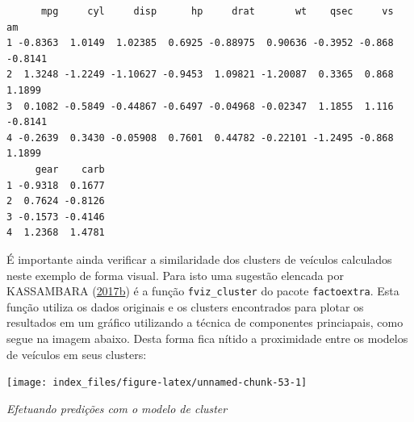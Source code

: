 \documentclass[12pt,brazil,oneside]{book}
\newenvironment{Shaded}{\begin{snugshade}}{\end{snugshade}}
\newcommand{\CommentTok}[1]{\textcolor[rgb]{0.56,0.35,0.01}{\textit{#1}}}
\newcommand{\DataTypeTok}[1]{\textcolor[rgb]{0.13,0.29,0.53}{#1}}
\newcommand{\KeywordTok}[1]{\textcolor[rgb]{0.13,0.29,0.53}{\textbf{#1}}}
\newcommand{\NormalTok}[1]{#1}
\newcommand{\OtherTok}[1]{\textcolor[rgb]{0.56,0.35,0.01}{#1}}
\newcommand{\StringTok}[1]{\textcolor[rgb]{0.31,0.60,0.02}{#1}}
\begin{document}
\begin{verbatim}
      mpg     cyl     disp      hp     drat       wt    qsec     vs      am
1 -0.8363  1.0149  1.02385  0.6925 -0.88975  0.90636 -0.3952 -0.868 -0.8141
2  1.3248 -1.2249 -1.10627 -0.9453  1.09821 -1.20087  0.3365  0.868  1.1899
3  0.1082 -0.5849 -0.44867 -0.6497 -0.04968 -0.02347  1.1855  1.116 -0.8141
4 -0.2639  0.3430 -0.05908  0.7601  0.44782 -0.22101 -1.2495 -0.868  1.1899
     gear    carb
1 -0.9318  0.1677
2  0.7624 -0.8126
3 -0.1573 -0.4146
4  1.2368  1.4781
\end{verbatim}

É importante ainda verificar a similaridade dos clusters de veículos calculados neste exemplo de forma visual. Para isto uma sugestão elencada por KASSAMBARA (\protect\hyperlink{ref-Kassambara2017}{2017}\protect\hyperlink{ref-Kassambara2017}{b}) é a função \texttt{fviz\_cluster} do pacote \texttt{factoextra}. Esta função utiliza os dados originais e os clusters encontrados para plotar os resultados em um gráfico utilizando a técnica de componentes princiapais, como segue na imagem abaixo. Desta forma fica nítido a proximidade entre os modelos de veículos em seus clusters:

\begin{Shaded}
\end{Shaded}

\begin{center}\texttt{[image: index\_files/figure-latex/unnamed-chunk-53-1]} \end{center}

\emph{Efetuando predições com o modelo de cluster}
\end{document}
